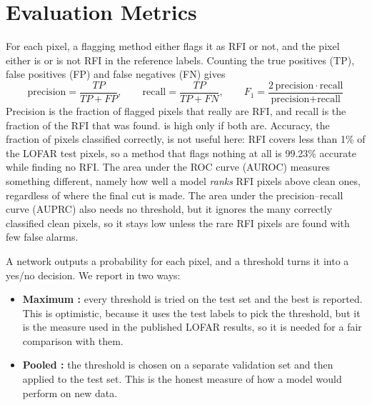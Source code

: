 \section{Evaluation Metrics}
\label{sec:metrics}
For each pixel, a flagging method either flags it as RFI or not, and the pixel
either is or is not RFI in the reference labels. Counting the true positives
(TP), false positives (FP) and false negatives (FN) gives
\begin{equation}
  \text{precision} = \frac{TP}{TP + FP}, \qquad
  \text{recall} = \frac{TP}{TP + FN}, \qquad
  F_1 = \frac{2\,\text{precision}\cdot\text{recall}}{\text{precision} + \text{recall}}
  \label{eq:f1}
\end{equation}
Precision is the fraction of flagged pixels that really are RFI, and recall is
the fraction of the RFI that was found. \Fone{} is high only if both are.
Accuracy, the fraction of pixels classified correctly, is not useful here: RFI
covers less than 1\% of the LOFAR test pixels, so a method that flags nothing
at all is 99.23\% accurate while finding no RFI. The area under the ROC curve
(AUROC) measures something different, namely how well a model \emph{ranks} RFI
pixels above clean ones, regardless of where the final cut is made. The area
under the precision--recall curve (AUPRC) also needs no threshold, but it
ignores the many correctly classified clean pixels, so it stays low unless the
rare RFI pixels are found with few false alarms.

A network outputs a probability for each pixel, and a threshold turns it into a
yes/no decision. We report \Fone{} in two ways:
\begin{itemize}
  \item \textbf{Maximum \Fone{}:} every threshold is tried on the test set and
    the best is reported. This is optimistic, because it uses the test labels
    to pick the threshold, but it is the measure used in the published LOFAR
    results, so it is needed for a fair comparison with them.
  \item \textbf{Pooled \Fone{}:} the threshold is chosen on a separate
    validation set and then applied to the test set. This is the honest
    measure of how a model would perform on new data.
\end{itemize}

